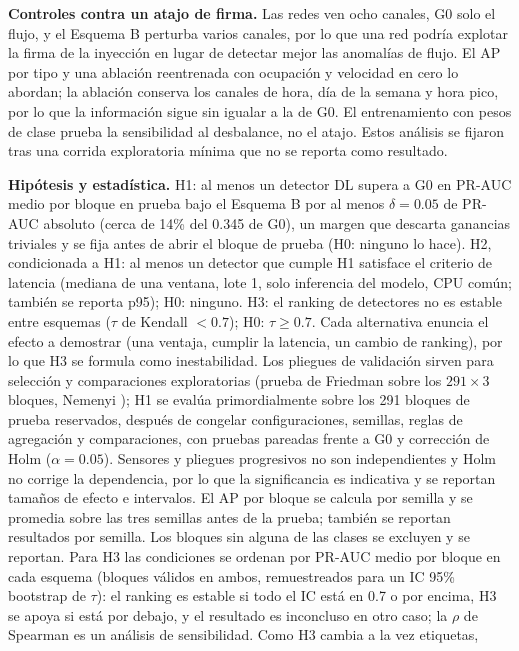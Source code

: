 \documentclass[conference]{IEEEtran}
\begin{document}
\textbf{Controles contra un atajo de firma.} Las redes ven ocho canales, G0
solo el flujo, y el Esquema B perturba varios canales, por lo que una red
podr\'ia explotar la firma de la inyecci\'on en lugar de detectar mejor las
anomal\'ias de flujo. El AP por tipo y una ablaci\'on reentrenada con ocupaci\'on
y velocidad en cero lo abordan; la ablaci\'on conserva los canales de hora,
d\'ia de la semana y hora pico, por lo que la informaci\'on sigue sin igualar a
la de G0. El entrenamiento con pesos de clase prueba la sensibilidad al
desbalance, no el atajo. Estos an\'alisis se fijaron tras una corrida
exploratoria m\'inima que no se reporta como resultado.

\textbf{Hip\'otesis y estad\'istica.} H1: al menos un detector DL supera a G0
en PR-AUC medio por bloque en prueba bajo el Esquema B por al menos
$\delta=0.05$ de PR-AUC absoluto (cerca de 14\% del 0.345 de G0), un margen que
descarta ganancias triviales y se fija antes de abrir el bloque de prueba (H0:
ninguno lo hace). H2, condicionada a H1: al menos
un detector que cumple H1 satisface el criterio de latencia (mediana de una
ventana, lote 1, solo inferencia del modelo, CPU com\'un; tambi\'en se reporta
p95); H0: ninguno. H3: el ranking de detectores no es estable entre esquemas
($\tau$ de Kendall $<0.7$); H0: $\tau\geq0.7$. Cada alternativa enuncia el efecto a demostrar (una ventaja,
cumplir la latencia, un cambio de ranking), por lo que H3 se formula como
inestabilidad. Los pliegues de validaci\'on
sirven para selecci\'on y comparaciones exploratorias (prueba de Friedman sobre
los $291\times3$ bloques, Nemenyi \cite{demsar2006statistical}); H1 se eval\'ua
primordialmente sobre los 291 bloques de prueba reservados, despu\'es de
congelar configuraciones, semillas, reglas de agregaci\'on y comparaciones, con
pruebas pareadas frente a G0 y correcci\'on de Holm ($\alpha=0.05$). Sensores y
pliegues progresivos no son independientes y Holm no corrige la dependencia,
por lo que la significancia es indicativa y se reportan tama\~nos de efecto e
intervalos. El AP por bloque se calcula por semilla y se promedia sobre las
tres semillas antes de la prueba; tambi\'en se reportan resultados por semilla.
Los bloques sin alguna de las clases se excluyen y se reportan. Para H3 las
condiciones se ordenan por PR-AUC medio por bloque en cada esquema (bloques
v\'alidos en ambos, remuestreados para un IC 95\% bootstrap de $\tau$): el
ranking es estable si todo el IC est\'a en 0.7 o por encima, H3 se apoya si
est\'a por debajo, y el resultado es inconcluso en otro caso; la $\rho$ de
Spearman es un an\'alisis de sensibilidad. Como H3 cambia a la vez etiquetas,
\end{document}
